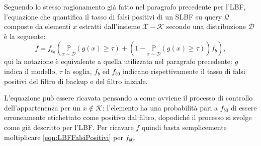 \documentclass[../../main.tex]{subfiles}
\begin{document}
    Seguendo lo stesso ragionamento già fatto nel paragrafo precedente per l'LBF, l'equazione che quantifica il tasso di falsi positivi di un SLBF su query $\mathcal{Q}$ composte da elementi $x$ estratti dall'insieme $\mathcal{X} - \mathcal{K}$ secondo una distribuzione $\mathcal{D}$ è la seguente: 
    \begin{equation}
        f = f_{b_0}\left(\underset{x \sim \mathcal{D}}{\mathbb{P}}(g(x) \geq \tau) + (1 - \underset{x \sim \mathcal{D}}{\mathbb{P}}(g(x) \geq \tau))f_b\right),
        \label{eqn:SLBFFalsiPositivi}
    \end{equation}
    qui la notazione è equivalente a quella utilizzata nel paragrafo precedente: $g$ indica il modello, $\tau$ la soglia, $f_b$ ed $f_{b0}$ indicano rispettivamente il tasso di falsi positivi del filtro di backup e del filtro iniziale.

    L'equazione può essere ricavata pensando a come avviene il processo di controllo dell'appartenenza per un $x \notin \mathcal{K}$: l'elemento ha una probabilità pari a $f_{b0}$ di essere erroneamente etichettato come positivo dal filtro, dopodiché il processo si svolge come già descritto per l'LBF. Per ricavare $f$ quindi basta semplicemente moltiplicare \eqref{eqn:LBFFalsiPositivi} per $f_{b0}$.
\end{document}
